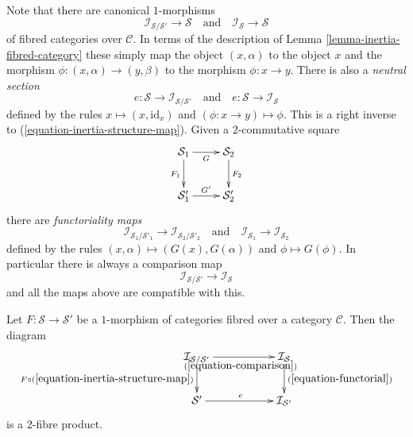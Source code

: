 \noindent
Note that there are canonical $1$-morphisms
\begin{equation}
\label{equation-inertia-structure-map}
\mathcal{I}_{\mathcal{S}/\mathcal{S}'} \longrightarrow \mathcal{S}
\quad\text{and}\quad
\mathcal{I}_\mathcal{S} \longrightarrow \mathcal{S}
\end{equation}
of fibred categories over $\mathcal{C}$. In terms of the description of
Lemma \ref{lemma-inertia-fibred-category}
these simply map the object $(x, \alpha)$ to the object $x$ and the morphism
$\phi : (x, \alpha) \to (y, \beta)$ to the morphism $\phi : x \to y$.
There is also a {\it neutral section}
\begin{equation}
\label{equation-neutral-section}
e : \mathcal{S} \to \mathcal{I}_{\mathcal{S}/\mathcal{S}'}
\quad\text{and}\quad
e : \mathcal{S} \to \mathcal{I}_\mathcal{S}
\end{equation}
defined by the rules $x \mapsto (x, \text{id}_x)$ and
$(\phi : x \to y) \mapsto \phi$. This is a right inverse to
(\ref{equation-inertia-structure-map}). Given a $2$-commutative
square
$$
\xymatrix{
\mathcal{S}_1 \ar[d]_{F_1} \ar[r]_G & \mathcal{S}_2 \ar[d]^{F_2} \\
\mathcal{S}'_1 \ar[r]^{G'} & \mathcal{S}'_2
}
$$
there are {\it functoriality maps}
\begin{equation}
\label{equation-functorial}
\mathcal{I}_{\mathcal{S}_1/\mathcal{S}'_1}
\longrightarrow
\mathcal{I}_{\mathcal{S}_2/\mathcal{S}'_2}
\quad\text{and}\quad
\mathcal{I}_{\mathcal{S}_1}
\longrightarrow
\mathcal{I}_{\mathcal{S}_2}
\end{equation}
defined by the rules $(x, \alpha) \mapsto (G(x), G(\alpha))$
and $\phi \mapsto G(\phi)$. In particular there is always a
comparison map
\begin{equation}
\label{equation-comparison}
\mathcal{I}_{\mathcal{S}/\mathcal{S}'}
\longrightarrow
\mathcal{I}_\mathcal{S}
\end{equation}
and all the maps above are compatible with this.

\begin{lemma}
\label{lemma-relative-inertia-as-fibre-product}
Let $F : \mathcal{S} \to \mathcal{S}'$ be a $1$-morphism of categories
fibred over a category $\mathcal{C}$. Then the diagram
$$
\xymatrix{
\mathcal{I}_{\mathcal{S}/\mathcal{S}'}
\ar[d]_{F \circ (\ref{equation-inertia-structure-map})}
\ar[rr]_{(\ref{equation-comparison})} & &
\mathcal{I}_\mathcal{S} \ar[d]^{(\ref{equation-functorial})} \\
\mathcal{S}' \ar[rr]^e & &
\mathcal{I}_{\mathcal{S}'}
}
$$
is a $2$-fibre product.
\end{lemma}

